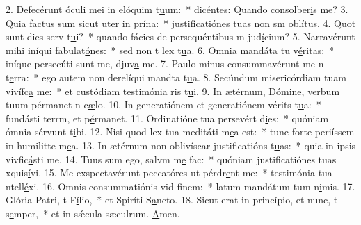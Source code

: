 2. Defecérunt óculi mei in elóquim t\uline{u}um:~* dicéntes: Quando consolber\uline{i}s me?
3. Quia factus sum sicut uter in pr\uline{í}na:~* justificatiónes tuas non sm obl\uline{í}tus.
4. Quot sunt dies serv t\uline{u}i?~* quando fácies de persequéntibus m jud\uline{í}cium?
5. Narravérunt mihi iníqui fabulat\uline{ó}nes:~* sed non t lex t\uline{u}a.
6. Omnia mandáta tu v\uline{é}ritas:~* iníque persecúti sunt me, djuv\uline{a} me.
7. Paulo minus consummavérunt me n t\uline{e}rra:~* ego autem non derelíqui mandta t\uline{u}a.
8. Secúndum misericórdiam tuam vivífc\uline{a} me:~* et custódiam testimónia ris t\uline{u}i.
9. In ætérnum, Dómine, verbum tuum pérmanet n c\uline{æ}lo.
10. In generatiónem et generatiónem vérits t\uline{u}a:~* fundásti terrm, et p\uline{é}rmanet.
11. Ordinatióne tua persevért d\uline{i}es:~* quóniam ómnia sérvunt t\uline{i}bi.
12. Nisi quod lex tua meditáti m\uline{e}a est:~* tunc forte periíssem in humilitte m\uline{e}a.
13. In ætérnum non oblivíscar justificatións t\uline{u}as:~* quia in ipsis vivfic\uline{á}sti me.
14. Tuus sum ego, salvm m\uline{e} fac:~* quóniam justificatiónes tuas xquis\uline{í}vi.
15. Me exspectavérunt peccatóres ut pérdr\uline{e}nt me:~* testimónia tua ntell\uline{é}xi.
16. Omnis consummatiónis vid f\uline{i}nem:~* latum mandátum tum n\uline{i}mis.
17. Glória Patri, t F\uline{í}lio,~* et Spiríti S\uline{a}ncto.
18. Sicut erat in princípio, et nunc, t s\uline{e}mper,~* et in sǽcula sæculrum. \uline{A}men.
